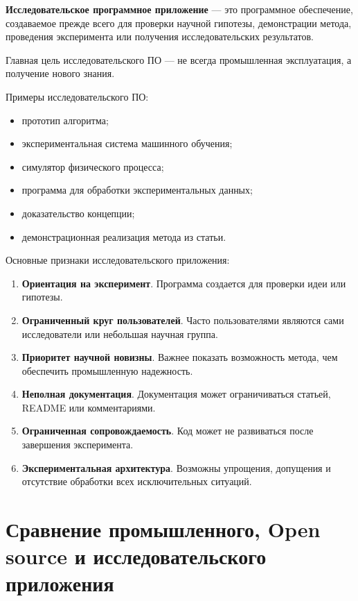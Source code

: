 \documentclass[12pt,a4paper]{article}
\begin{document}
\textbf{Исследовательское программное приложение} --- это программное обеспечение, создаваемое прежде всего для проверки научной гипотезы, демонстрации метода, проведения эксперимента или получения исследовательских результатов.

Главная цель исследовательского ПО --- не всегда промышленная эксплуатация, а получение нового знания.

Примеры исследовательского ПО:

\begin{itemize}
    \item прототип алгоритма;
    \item экспериментальная система машинного обучения;
    \item симулятор физического процесса;
    \item программа для обработки экспериментальных данных;
    \item доказательство концепции;
    \item демонстрационная реализация метода из статьи.
\end{itemize}

Основные признаки исследовательского приложения:

\begin{enumerate}
    \item \textbf{Ориентация на эксперимент}. Программа создается для проверки идеи или гипотезы.

    \item \textbf{Ограниченный круг пользователей}. Часто пользователями являются сами исследователи или небольшая научная группа.

    \item \textbf{Приоритет научной новизны}. Важнее показать возможность метода, чем обеспечить промышленную надежность.

    \item \textbf{Неполная документация}. Документация может ограничиваться статьей, README или комментариями.

    \item \textbf{Ограниченная сопровождаемость}. Код может не развиваться после завершения эксперимента.

    \item \textbf{Экспериментальная архитектура}. Возможны упрощения, допущения и отсутствие обработки всех исключительных ситуаций.
\end{enumerate}

\section{Сравнение промышленного, Open source и исследовательского приложения}
\end{document}
